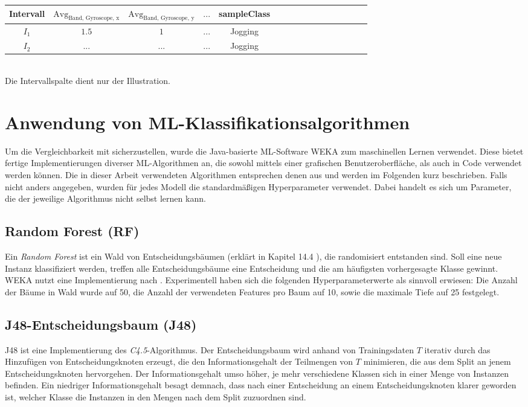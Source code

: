 \begin{tabular}{|c|c|c|c|c|c|c|c|c|c|c|c|c|c|c|c|}
	\hline 
	Intervall & $\text{Avg}_\text{Band, Gyroscope, x}$ & $\text{Avg}_\text{Band, Gyroscope, y}$  & $...$  & sampleClass  \\ 
	\hline 
	$I_1$ & $1.5$ & $1$ & $...$ & Jogging \\ 
	\hline 
	$I_2$ & $...$ & $...$ & $...$ & Jogging   \\ 
	\hline 
\end{tabular} \\

Die Intervallspalte dient nur der Illustration.

\section{Anwendung von ML-Klassifikationsalgorithmen}
\label{section:ml-algos}
Um die Vergleichbarkeit mit \cite{Weiss2016} sicherzustellen, wurde die Java-basierte ML-Software WEKA zum maschinellen Lernen verwendet. Diese bietet fertige Implementierungen diverser ML-Algorithmen an, die sowohl mittels einer grafischen Benutzeroberfläche, als auch in Code verwendet werden können. Die in dieser Arbeit verwendeten Algorithmen entsprechen denen aus \cite{Weiss2016} und werden im Folgenden kurz beschrieben. Falls nicht anders angegeben, wurden für jedes Modell die standardmäßigen Hyperparameter verwendet. Dabei handelt es sich um Parameter, die der jeweilige Algorithmus nicht selbst lernen kann.
\subsection{Random Forest (RF)}
Ein \textit{Random Forest} ist ein Wald von Entscheidungsbäumen (erklärt in Kapitel 14.4 \cite{Bishop2006}), die randomisiert entstanden sind. Soll eine neue Instanz klassifiziert werden, treffen alle Entscheidungsbäume eine Entscheidung und die am häufigsten vorhergesagte Klasse gewinnt. WEKA nutzt eine Implementierung nach \cite{Breiman2001}. Experimentell haben sich die folgenden Hyperparameterwerte als sinnvoll erwiesen: Die Anzahl der Bäume in Wald wurde auf 50, die Anzahl der verwendeten Features pro Baum auf 10, sowie die maximale Tiefe auf 25 festgelegt.
\subsection{J48-Entscheidungsbaum (J48)}
J48 ist eine Implementierung des \textit{C4.5}-Algorithmus\cite{Quinlan1993}. Der Entscheidungsbaum wird anhand von Trainingsdaten $T$ iterativ durch das Hinzufügen von Entscheidungsknoten erzeugt, die den Informationsgehalt der Teilmengen von $T$ minimieren, die aus dem Split an jenem Entscheidungsknoten hervorgehen. Der Informationsgehalt umso höher, je mehr verschiedene Klassen sich in einer Menge von Instanzen befinden. Ein niedriger Informationsgehalt besagt demnach, dass nach einer Entscheidung an einem Entscheidungsknoten klarer geworden ist, welcher Klasse die Instanzen in den Mengen nach dem Split zuzuordnen sind.
